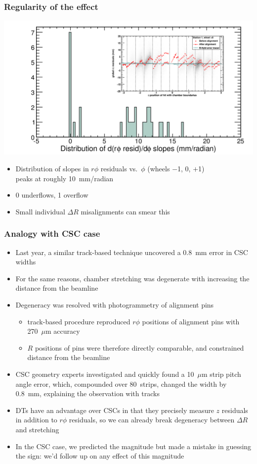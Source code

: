 \documentclass[compress]{beamer}
\begin{document}
\begin{frame}
\frametitle{Regularity of the effect}
\includegraphics[width=\linewidth]{slopehist.png}

\begin{itemize}
\item Distribution of slopes in $r\phi$ residuals vs.\ $\phi$ (wheels
  $-$1, 0, $+$1) \\ peaks at roughly 10~mm/radian
\item 0 underflows, 1 overflow
\item Small individual $\Delta R$ misalignments can smear this
\end{itemize}
\end{frame}

\begin{frame}
\frametitle{Analogy with CSC case}
\begin{itemize}
\item Last year, a similar track-based technique uncovered a 0.8~mm error in CSC widths
\item For the same reasons, chamber stretching was degenerate with increasing the distance from the beamline
\item Degeneracy was resolved with photogrammetry of alignment pins
\begin{itemize}
\item track-based procedure reproduced $r\phi$ positions of alignment pins with 270~$\mu$m accuracy
\item $R$ positions of pins were therefore directly comparable, and constrained distance from the beamline
\end{itemize}
\item CSC geometry experts investigated and quickly found a 10~$\mu$m strip pitch
  angle error, which, compounded over 80~strips, changed the width by
  0.8~mm, explaining the observation with tracks
\item DTs have an advantage over CSCs in that they precisely measure
  $z$ residuals in addition to $r\phi$ residuals, so we can already
  break degeneracy between $\Delta R$ and stretching
\item In the CSC case, we predicted the magnitude but made a mistake in guessing
  the sign: we'd follow up on any effect of this magnitude
\end{itemize}
\end{frame}
\end{document}
